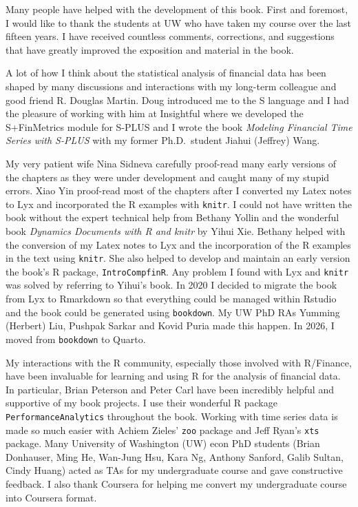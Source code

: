 \documentclass[
  letterpaper,
  DIV=11,
  numbers=noendperiod]{scrreprt}
\theoremstyle{definition}
\theoremstyle{definition}
\theoremstyle{remark}
\begin{document}

Many people have helped with the development of this book. First and
foremost, I would like to thank the students at UW who have taken my
course over the last fifteen years. I have received countless comments,
corrections, and suggestions that have greatly improved the exposition
and material in the book.

A lot of how I think about the statistical analysis of financial data
has been shaped by many discussions and interactions with my long-term
colleague and good friend R. Douglas Martin. Doug introduced me to the S
language and I had the pleasure of working with him at Insightful where
we developed the S+FinMetrics module for S-PLUS and I wrote the book
\emph{Modeling Financial Time Series with S-PLUS} with my former
Ph.D.~student Jiahui (Jeffrey) Wang.

My very patient wife Nina Sidneva carefully proof-read many early
versions of the chapters as they were under development and caught many
of my stupid errors. Xiao Yin proof-read most of the chapters after I
converted my Latex notes to Lyx and incorporated the R examples with
\texttt{knitr}. I could not have written the book without the expert
technical help from Bethany Yollin and the wonderful book \emph{Dynamics
Documents with R and knitr} by Yihui Xie. Bethany helped with the
conversion of my Latex notes to Lyx and the incorporation of the R
examples in the text using \texttt{knitr}. She also helped to develop
and maintain an early version the book's R package,
\texttt{IntroCompfinR}. Any problem I found with Lyx and \texttt{knitr}
was solved by referring to Yihui's book. In 2020 I decided to migrate
the book from Lyx to Rmarkdown so that everything could be managed
within Rstudio and the book could be generated using \texttt{bookdown}.
My UW PhD RAs Yumming (Herbert) Liu, Pushpak Sarkar and Kovid Puria made
this happen. In 2026, I moved from \texttt{bookdown} to Quarto.

My interactions with the R community, especially those involved with
R/Finance, have been invaluable for learning and using R for the
analysis of financial data. In particular, Brian Peterson and Peter Carl
have been incredibly helpful and supportive of my book projects. I use
their wonderful R package \texttt{PerformanceAnalytics} throughout the
book. Working with time series data is made so much easier with Achiem
Zieles' \texttt{zoo} package and Jeff Ryan's \texttt{xts} package. Many
University of Washington (UW) econ PhD students (Brian Donhauser, Ming
He, Wan-Jung Hsu, Kara Ng, Anthony Sanford, Galib Sultan, Cindy Huang)
acted as TAs for my undergraduate course and gave constructive feedback.
I also thank Coursera for helping me convert my undergraduate course
into Coursera format.
\end{document}
